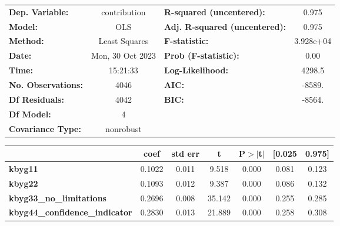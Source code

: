 \begin{center}
\begin{tabular}{lclc}
\toprule
\textbf{Dep. Variable:}                &   contribution   & \textbf{  R-squared (uncentered):}      &     0.975   \\
\textbf{Model:}                        &       OLS        & \textbf{  Adj. R-squared (uncentered):} &     0.975   \\
\textbf{Method:}                       &  Least Squares   & \textbf{  F-statistic:       }          & 3.928e+04   \\
\textbf{Date:}                         & Mon, 30 Oct 2023 & \textbf{  Prob (F-statistic):}          &     0.00    \\
\textbf{Time:}                         &     15:21:33     & \textbf{  Log-Likelihood:    }          &    4298.5   \\
\textbf{No. Observations:}             &        4046      & \textbf{  AIC:               }          &    -8589.   \\
\textbf{Df Residuals:}                 &        4042      & \textbf{  BIC:               }          &    -8564.   \\
\textbf{Df Model:}                     &           4      & \textbf{                     }          &             \\
\textbf{Covariance Type:}              &    nonrobust     & \textbf{                     }          &             \\
\bottomrule
\end{tabular}
\begin{tabular}{lcccccc}
                                       & \textbf{coef} & \textbf{std err} & \textbf{t} & \textbf{P$> |$t$|$} & \textbf{[0.025} & \textbf{0.975]}  \\
\midrule
\textbf{kbyg11}                        &       0.1022  &        0.011     &     9.518  &         0.000        &        0.081    &        0.123     \\
\textbf{kbyg22}                        &       0.1093  &        0.012     &     9.387  &         0.000        &        0.086    &        0.132     \\
\textbf{kbyg33\_no\_limitations}       &       0.2696  &        0.008     &    35.142  &         0.000        &        0.255    &        0.285     \\
\textbf{kbyg44\_confidence\_indicator} &       0.2830  &        0.013     &    21.889  &         0.000        &        0.258    &        0.308     \\

\end{tabular}
\end{center}
